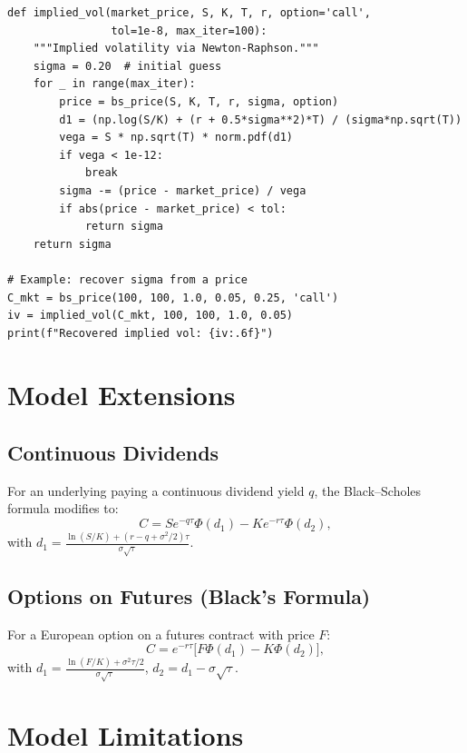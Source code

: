 \begin{codeblock}[title=\textbf{Implied Volatility (Newton-Raphson)}]
\begin{verbatim}
def implied_vol(market_price, S, K, T, r, option='call',
                tol=1e-8, max_iter=100):
    """Implied volatility via Newton-Raphson."""
    sigma = 0.20  # initial guess
    for _ in range(max_iter):
        price = bs_price(S, K, T, r, sigma, option)
        d1 = (np.log(S/K) + (r + 0.5*sigma**2)*T) / (sigma*np.sqrt(T))
        vega = S * np.sqrt(T) * norm.pdf(d1)
        if vega < 1e-12:
            break
        sigma -= (price - market_price) / vega
        if abs(price - market_price) < tol:
            return sigma
    return sigma

# Example: recover sigma from a price
C_mkt = bs_price(100, 100, 1.0, 0.05, 0.25, 'call')
iv = implied_vol(C_mkt, 100, 100, 1.0, 0.05)
print(f"Recovered implied vol: {iv:.6f}")
\end{verbatim}
\end{codeblock}

\section{Model Extensions}

\subsection{Continuous Dividends}

For an underlying paying a continuous dividend yield $q$, the Black--Scholes
formula modifies to:
\[
    C = Se^{-q\tau}\Phi(d_1) - Ke^{-r\tau}\Phi(d_2),
\]
with $d_1 = \frac{\ln(S/K) + (r - q + \sigma^2/2)\tau}{\sigma\sqrt{\tau}}$.

\subsection{Options on Futures (Black's Formula)}

\begin{theorem}
For a European option on a futures contract with price $F$:
\[
    C = e^{-r\tau}\bigl[F\Phi(d_1) - K\Phi(d_2)\bigr],
\]
with $d_1 = \frac{\ln(F/K) + \sigma^2\tau/2}{\sigma\sqrt{\tau}}$,
$d_2 = d_1 - \sigma\sqrt{\tau}$.
\end{theorem}

\section{Model Limitations}

